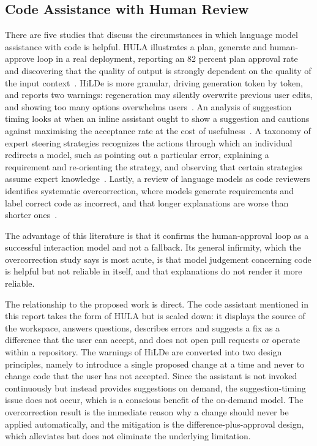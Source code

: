 \documentclass{FastFyp}
\begin{document}
\subsection{Code Assistance with Human Review}
There are five studies that discuss the circumstances in which language model assistance with code is helpful. HULA illustrates a plan, generate and human-approve loop in a real deployment, reporting an 82 percent plan approval rate and discovering that the quality of output is strongly dependent on the quality of the input context~\cite{ref:takerngsaksiri2025}. HiLDe is more granular, driving generation token by token, and reports two warnings: regeneration may silently overwrite previous user edits, and showing too many options overwhelms users~\cite{ref:gonzalez2025}. An analysis of suggestion timing looks at when an inline assistant ought to show a suggestion and cautions against maximising the acceptance rate at the cost of usefulness~\cite{ref:mozannar2024}. A taxonomy of expert steering strategies recognizes the actions through which an individual redirects a model, such as pointing out a particular error, explaining a requirement and re-orienting the strategy, and observing that certain strategies assume expert knowledge~\cite{ref:chidambaram2024}. Lastly, a review of language models as code reviewers identifies systematic overcorrection, where models generate requirements and label correct code as incorrect, and that longer explanations are worse than shorter ones~\cite{ref:jin2026}.

The advantage of this literature is that it confirms the human-approval loop as a successful interaction model and not a fallback. Its general infirmity, which the overcorrection study says is most acute, is that model judgement concerning code is helpful but not reliable in itself, and that explanations do not render it more reliable.

The relationship to the proposed work is direct. The code assistant mentioned in this report takes the form of HULA but is scaled down: it displays the source of the workspace, answers questions, describes errors and suggests a fix as a difference that the user can accept, and does not open pull requests or operate within a repository. The warnings of HiLDe are converted into two design principles, namely to introduce a single proposed change at a time and never to change code that the user has not accepted. Since the assistant is not invoked continuously but instead provides suggestions on demand, the suggestion-timing issue does not occur, which is a conscious benefit of the on-demand model. The overcorrection result is the immediate reason why a change should never be applied automatically, and the mitigation is the difference-plus-approval design, which alleviates but does not eliminate the underlying limitation.
\end{document}
